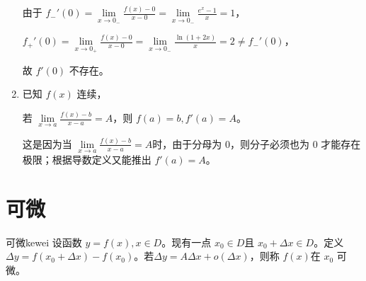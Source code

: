 \begin{note}
\begin{enumerate}
\begin{solution}
            由于 $f_{-}'(0)=\lim\limits_{x\to 0_{-}}\frac{f(x)-0}{x-0}=\lim\limits_{x \to 0_{-}}\frac{e^x-1}{x}=1$，
        
            $f_{+}'(0)=\lim\limits_{x\to 0_{+}}\frac{f(x)-0}{x-0}=\lim\limits_{x \to 0_{-}}\frac{\ln(1+2x)}{x}=2 \neq f_{-}'(0)$，
        
            故 $f'(0)$ 不存在。
        \end{solution}

        \item 已知 $f(x)$ 连续，
        
        若 $\lim\limits_{x \to a}\frac{f(x)-b}{x-a}=A$，则 $f(a)=b,f'(a)=A$。

        这是因为当 $\lim\limits_{x \to a}\frac{f(x)-b}{x-a}=A$时，由于分母为 $0$，则分子必须也为 $0$ 才能存在极限；根据导数定义又能推出 $f'(a)=A$。
        \end{enumerate}
    \section{可微}
    \begin{definition}{可微}{kewei}
    设函数 $y=f(x),x\in D$。现有一点 $x_0\in D$且 $x_0+\Delta x \in D$。定义 $\Delta y=f(x_0+\Delta x)-f(x_0)$。若$\Delta y=A\Delta x+o(\Delta x)$，则称 $f(x)$在 $x_0$ 可微。
    \end{definition}
        
\end{note}



